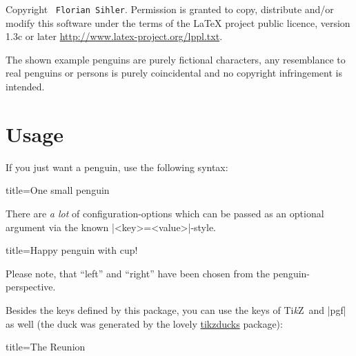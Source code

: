 \documentclass[parskip=half,english,noenddot,numbers=noenddot,footnotes=nomultiple,oneside]{scrartcl}
\let\say\enquote
\def\TikZ{Ti\textit{k}Z}
\begin{document}
Copyright \textcopyright\ \texttt{Florian Sihler}. Permission is granted to copy, distribute and\slash or modify this software under the terms of the LaTeX project public licence, version 1.3c or later \url{http://www.latex-project.org/lppl.txt}.

The shown example penguins are purely fictional characters, any resemblance to real penguins or persons is purely coincidental and no copyright infringement is intended.

\section{Usage}

If you just want a penguin, use the following syntax:
\begin{tcblisting}{title={One small penguin}}
\begin{tikzpicture}
	\pingu
\end{tikzpicture}
\end{tcblisting}

There are \textit{a lot} of configuration-options which can be passed as an optional argument via the known |<key>=<value>|-style.
\begin{tcblisting}{title={Happy penguin with cup!}}
\end{tcblisting}
Please note, that \say{left} and \say{right} have been chosen from the penguin-perspective.

Besides the keys defined by this package, you can use the keys of \TikZ\ and |pgf| as well (the duck was generated by the lovely \href{https://github.com/samcarter/tikzducks}{tikzducks} package):
\begin{tcblisting}{title={The Reunion}}
\begin{tikzpicture}
	\duck
	\pingu[xshift=3cm, yshift=14mm,
	       eyes wink]
\end{tikzpicture}
\end{tcblisting}
\end{document}
